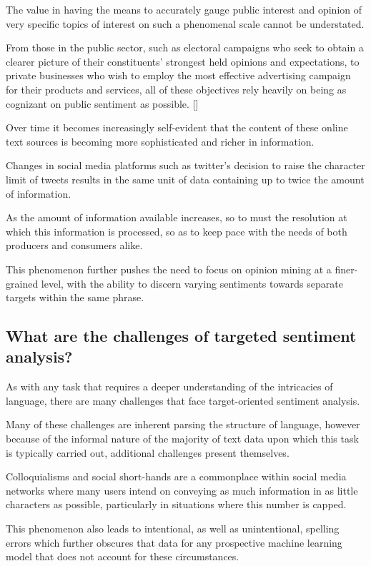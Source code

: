 \documentclass[12pt, a4paper]{report}
\theoremstyle{definition}
\theoremstyle{definition}%
\theoremstyle{definition}%
\theoremstyle{definition}%
\theoremstyle{definition}%
\theoremstyle{definition}%
\renewcommand{\cite}[1]{[\citealp{#1}]}
\begin{document}
The value in having the means to accurately gauge public interest and opinion of very specific topics of interest on such a phenomenal scale cannot be understated.

From those in the public sector, such as electoral campaigns who seek to obtain a clearer picture of their constituents' strongest held opinions and expectations, to private businesses who wish to employ the most effective advertising campaign for their products and services, all of these objectives rely heavily on being as cognizant on public sentiment as possible. \cite{tang2016}

Over time it becomes increasingly self-evident that the content of these online text sources is becoming more sophisticated and richer in information. 

Changes in social media platforms such as twitter's decision to raise the character limit of tweets results in the same unit of data containing up to twice the amount of information.

As the amount of information available increases, so to must the resolution at which this information is processed, so as to keep pace with the needs of both producers and consumers alike.    

This phenomenon further pushes the need to focus on opinion mining at a finer-grained level, with the ability to discern varying sentiments towards separate targets within the same phrase. 
\subsection{What are the challenges of targeted sentiment analysis?}
As with any task that requires a deeper understanding of the intricacies of language, there are many challenges that face target-oriented sentiment analysis. 

Many of these challenges are inherent parsing the structure of language, however because of the informal nature of the majority of text data upon which this task is typically carried out, additional challenges present themselves.

Colloquialisms and social short-hands are a commonplace within social media networks where many users intend on conveying as much information in as little characters as possible, particularly in situations where this number is capped. 

This phenomenon also leads to intentional, as well as unintentional, spelling errors which further obscures that data for any prospective machine learning model that does not account for these circumstances. 
\end{document}
